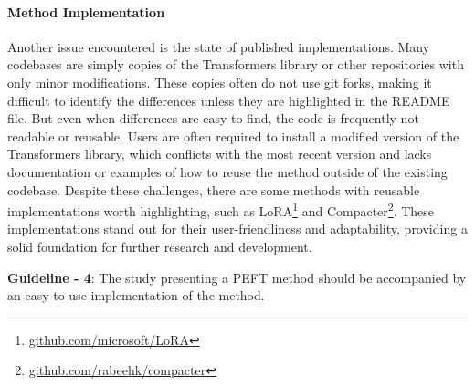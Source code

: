 \paragraph{Method Implementation} Another issue encountered is the state of published implementations. Many codebases are simply copies of the Transformers library \citep{Wolf_Transformers_State-of-the-Art_Natural_2020} or other repositories with only minor modifications. These copies often do not use git forks, making it difficult to identify the differences unless they are highlighted in the README file. But even when differences are easy to find, the code is frequently not readable or reusable. Users are often required to install a modified version of the Transformers library, which conflicts with the most recent version and lacks documentation or examples of how to reuse the method outside of the existing codebase. Despite these challenges, there are some methods with reusable implementations worth highlighting, such as LoRA\footnote{\href{https://github.com/microsoft/LoRA}{github.com/microsoft/LoRA}} and Compacter\footnote{\href{https://github.com/rabeehk/compacter}{github.com/rabeehk/compacter}}. These implementations stand out for their user-friendliness and adaptability, providing a solid foundation for further research and development.

\begin{tcolorbox}[
    colback=gray!05,  
    colframe=black!50, boxrule=0.5pt, arc=3mm,           
    width=\linewidth,  
    leftrule=0.1mm, rightrule=0.1mm, bottomrule=0.1mm, toprule=0.1mm, ]
\textbf{Guideline - 4}: The study presenting a PEFT method should be accompanied by an easy-to-use implementation of the method.
\end{tcolorbox}

